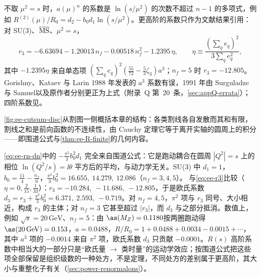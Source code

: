 不取 $\mu^2=s$ 时，$a(\mu)^n$ 的系数是 $\ln(s/\mu^2)$ 的次数不超过 $n-1$ 的多项式，例如 $R^{(2)}(\mu)/R_0=d_2-b_0d_1\ln(s/\mu^2)$。更高阶的系数只作为文献结果引用：对 SU(3)、$\overline{\rm MS}$、$\mu^2=s$，
\begin{equation}\label{eq:ee-r3}
r_3=-6.63694-1.20013\,n_f-0.00518\,n_f^2-1.2395\,\eta,\qquad \eta\equiv\frac{(\sum_qe_q)^2}{3\sum_qe_q^2},
\end{equation}
其中 $-1.2395\eta$ 来自单态项 $(\sum_qe_q)^2(\frac{55}{72}-\frac53\zeta_3)a^3$\cite{GorishniiKataevLarin1991,SurguladzeSamuel1991}；$n_f=5$ 时 $r_3=-12.805$。Gorishny、Kataev 与 Larin 1988 年发表的 $a^3$ 系数\cite{Gorishnii:1988bc}有误，1991 年由 Surguladze 与 Samuel\cite{SurguladzeSamuel1991}以及原作者\cite{GorishniiKataevLarin1991}分别更正为上式（附录~Q 第~20~条，\cref{sec:appQ-errata}）；四阶系数见\cite{BaikovChetyrkinKuhn2008}。

\cref{fig:ee-cutsum-disc}从割图一侧概括本章的结构：各类割线各自发散而其和有限，割线之和是前向函数的不连续性，由 Cauchy 定理它等于离开实轴的圆周上的积分——即围道公式与\cref{thm:ee-R-finite}的几何内容。


\begin{example}[$O(a^3)$ 的 $\pi^2$ 项]\label{ex:ee-pi2}
\cref{eq:ee-rn-dn}中的 $-\frac{\pi^2}3b_0^2d_1$ 完全来自围道公式：它是跑动耦合在圆周 $|Q^2|=s$ 上的相位 $\ln(Q^2/s)=\ii\theta$ 平方后的平均，与动力学无关。SU(3) 中 $d_1=1$，$b_0=\frac{11}4-\frac{n_f}6$，$\frac{\pi^2}3b_0^2=16.655,\ 14.279,\ 12.086$（$n_f=3,4,5$）。%
与\cref{eq:ee-r3}比较（$\eta=0,\frac2{15},\frac1{33}$）：$r_3=-10.284,\ -11.686,\ -12.805$，于是欧氏系数 $d_3=r_3+\frac{\pi^2}3b_0^2=6.371,\ 2.593,\ -0.719$。对 $n_f=4,5$，$\pi^2$ 项与 $r_3$ 同号、大小相近，构成 $r_3$ 的主体；对 $n_f=3$ 它甚至超过 $|r_3|$，而 $d_3$ 与之部分抵消。数值上，例如 $\sqrt s=20\,\mathrm{GeV}$、$n_f=5$：由 $\as(M_Z)=0.1180$\cite[式~(9.25)]{ParticleDataGroup:2024cfk}按两圈跑动得 $\as(20\,\mathrm{GeV})=0.153$，$a=0.0488$，$R/R_0=1+0.0488+0.0034-0.0015+\cdots$，其中 $a^3$ 项的 $-0.0014$ 来自 $\pi^2$ 项，欧氏系数 $d_3$ 只贡献 $-0.0001$。$R(s)$ 高阶系数中相当大的一部分只是“欧氏量 $\to$ 类时量”的运动学效应\cite{KrasnikovPivovarov1982,KataevStarshenko1995}；按围道公式把这些项全部保留是组织级数的一种处方，不是定理，不同处方的差别属于更高阶，其大小与重整化子有关（\cref{sec:power-renormalons}）。
\end{example}

